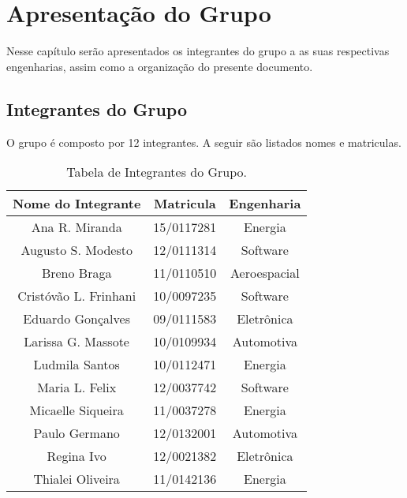 \chapter[Apresentação do Grupo]{Apresentação do Grupo}
\label{chap:apresentacao}
	
	Nesse capítulo serão apresentados os integrantes do grupo a as suas respectivas engenharias, assim como a organização do presente documento.

	\section[Integrantes do Grupo]{Integrantes do Grupo}
	\label{sec:apresentacao_integrantes}

		O grupo é composto por 12 integrantes. A seguir são listados nomes e matriculas.

		\label{subsubsec:informacoesGerais_integrantes_tables}
		\begin{table}[h]
			\centering 
			\begin{tabular}{|c|c|c|}
			\hline
			\rowcolor[HTML]{C0C0C0} 

				{\color[HTML]{000000} \textbf{Nome do Integrante}} & {\color[HTML]{000000} \textbf{Matricula}} & {\color[HTML]{000000} \textbf{Engenharia}} \\ \hline

				Ana R. Miranda & 15/0117281 & Energia \\ \hline
				Augusto S. Modesto & 12/0111314 & Software  \\ \hline
				Breno Braga & 11/0110510 & Aeroespacial \\ \hline
				Cristóvão L. Frinhani & 10/0097235 & Software \\ \hline
				Eduardo Gonçalves & 09/0111583 & Eletrônica \\ \hline
				Larissa G. Massote & 10/0109934 & Automotiva \\ \hline
				Ludmila Santos & 10/0112471 & Energia \\ \hline
				Maria L. Felix & 12/0037742 & Software \\ \hline
				Micaelle Siqueira & 11/0037278 & Energia \\ \hline
				Paulo Germano & 12/0132001 & Automotiva \\ \hline
				Regina Ivo & 12/0021382 & Eletrônica \\ \hline
				Thialei Oliveira & 11/0142136 & Energia \\ \hline

			\end{tabular}
			\caption[Tabela de Integrantes do Grupo]{Tabela de Integrantes do Grupo.}
			\label{tab:informacoesGerais_integrantes_.tables}
		\end{table}


